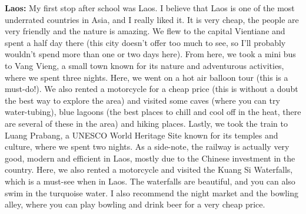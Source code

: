 \textbf{Laos:} My first stop after school was Laos. I believe that Laos is one of the most underrated countries in Asia, and I really liked it. It is very cheap, the people are very friendly and the nature is amazing. We flew to the capital Vientiane and spent a half day there (this city doesn't offer too much to see, so I'll probably wouldn't spend more than one or two days here). From here, we took a mini bus to Vang Vieng, a small town known for its nature and adventurous activities, where we spent three nights. Here, we went on a hot air balloon tour (this is a must-do!). We also rented a motorcycle for a cheap price (this is without a doubt the best way to explore the area) and visited some caves (where you can try water-tubing), blue lagoons (the best places to chill and cool off in the heat, there are several of these in the area) and hiking places. Lastly, we took the train to Luang Prabang, a UNESCO World Heritage Site known for its temples and culture, where we spent two nights. As a side-note, the railway is actually very good, modern and efficient in Laos, mostly due to the Chinese investment in the country. Here, we also rented a motorcycle and visited the Kuang Si Waterfalls, which is a must-see when in Laos. The waterfalls are beautiful, and you can also swim in the turquoise water. I also recommend the night market and the bowling alley, where you can play bowling and drink beer for a very cheap price.

